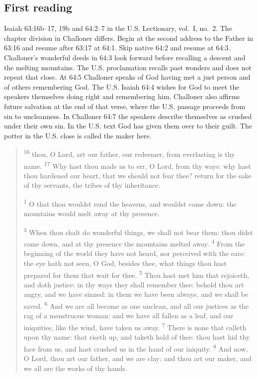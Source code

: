 \subsection{First reading}
\label{proper-first-reading}
Isaiah 63:16b--17, 19b and 64:2--7 in the U.S. Lectionary, vol.~I, no.~2. The chapter division in Challoner differs. Begin at the second address to the Father in 63:16 and resume after 63:17 at 64:1. Skip native 64:2 and resume at 64:3. Challoner's wonderful deeds in 64:3 look forward before recalling a descent and the melting mountains. The U.S. proclamation recalls past wonders and does not repeat that close. At 64:5 Challoner speaks of God having met a just person and of others remembering God. The U.S. Isaiah 64:4 wishes for God to meet the speakers themselves doing right and remembering him. Challoner also affirms future salvation at the end of that verse, where the U.S. passage proceeds from sin to uncleanness. In Challoner 64:7 the speakers describe themselves as crushed under their own sin. In the U.S. text God has given them over to their guilt. The potter in the U.S. close is called the maker here.
\begin{quote}
\textsuperscript{16} thou, O Lord, art our father, our redeemer, from everlasting is thy name.
\textsuperscript{17} Why hast thou made us to err, O Lord, from thy ways: why hast thou hardened our heart, that we should not fear thee? return for the sake of thy servants, the tribes of thy inheritance.

\textsuperscript{1} O that thou wouldst rend the heavens, and wouldst come down: the mountains would melt away at thy presence.

\textsuperscript{3} When thou shalt do wonderful things, we shall not bear them: thou didst come down, and at thy presence the mountains melted away.
\textsuperscript{4} From the beginning of the world they have not heard, nor perceived with the ears: the eye hath not seen, O God, besides thee, what things thou hast prepared for them that wait for thee.
\textsuperscript{5} Thou hast met him that rejoiceth, and doth justice: in thy ways they shall remember thee: behold thou art angry, and we have sinned: in them we have been always, and we shall be saved.
\textsuperscript{6} And we are all become as one unclean, and all our justices as the rag of a menstruous woman: and we have all fallen as a leaf, and our iniquities, like the wind, have taken us away.
\textsuperscript{7} There is none that calleth upon thy name: that riseth up, and taketh hold of thee: thou hast hid thy face from us, and hast crushed us in the hand of our iniquity.
\textsuperscript{8} And now, O Lord, thou art our father, and we are clay: and thou art our maker, and we all are the works of thy hands.
\end{quote}

